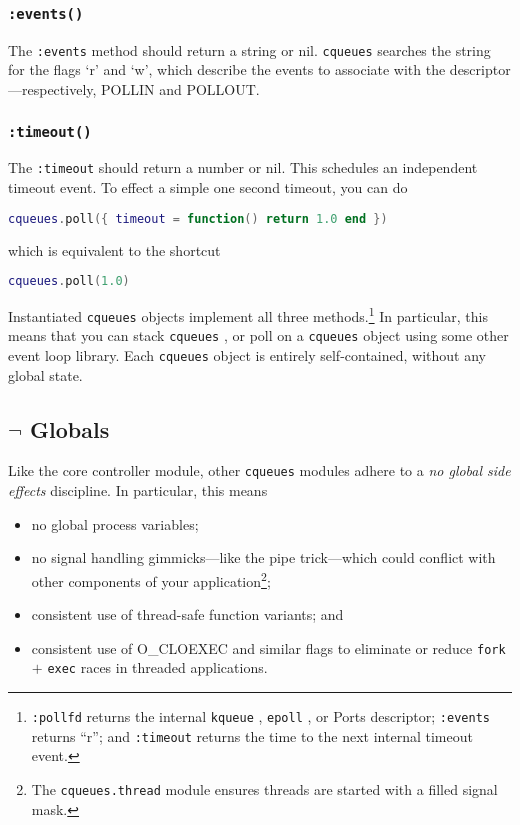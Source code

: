 \documentclass[11pt, oneside]{memoir}
\newcommand{\cqueues}[0]{\texttt{cqueues} }
\newcommand{\syscall}[1]{\texttt{#1} }
\newcommand{\method}[1]{\texttt{#1} }
\newcommand{\module}[1]{\texttt{#1} }
\begin{document}
\subsubsection[\method{object:events}]{\method{:events()}} The \method{:events} method should return a string or nil. \cqueues searches the string for the flags `r' and `w', which describe the events to associate with the descriptor---respectively, POLLIN and POLLOUT.

\subsubsection[\method{object:timeout}]{\method{:timeout()}} The \method{:timeout} should return a number or nil. This schedules an independent timeout event. To effect a simple one second timeout, you can do

\begin{lstlisting}[language=lua]
cqueues.poll({ timeout = function() return 1.0 end })
\end{lstlisting}

which is equivalent to the shortcut

\begin{lstlisting}[language=lua]
cqueues.poll(1.0)
\end{lstlisting}

Instantiated \cqueues objects implement all three methods.\footnote{\method{:pollfd} returns the internal \syscall{kqueue}, \syscall{epoll}, or Ports descriptor; \method{:events} returns ``r''; and \method{:timeout} returns the time to the next internal timeout event.} In particular, this means that you can stack \cqueues, or poll on a \cqueues object using some other event loop library. Each \cqueues object is entirely self-contained, without any global state.

\subsection{$\lnot$ Globals}

Like the core controller module, other \cqueues modules adhere to a \emph{no global side effects} discipline. In particular, this means
\begin{itemize}
\item no global process variables;
\item no signal handling gimmicks---like the pipe trick---which could conflict with other components of your application\footnote{The \module{cqueues.thread} module ensures threads are started with a filled signal mask.};
\item consistent use of thread-safe function variants; and
\item consistent use of O\_CLOEXEC and similar flags to eliminate or reduce \syscall{fork} $+$ \syscall{exec} races in threaded applications.
\end{itemize}
\end{document}
